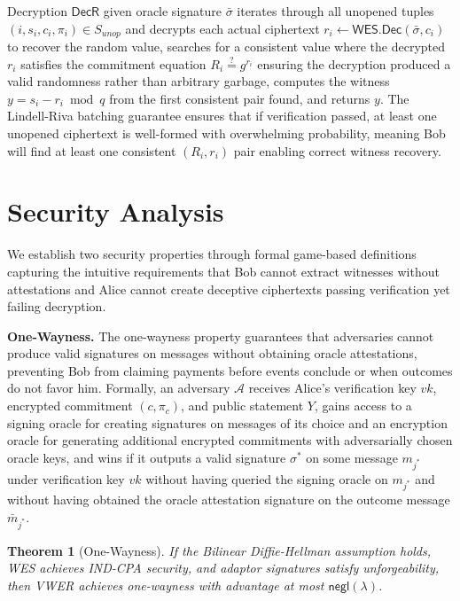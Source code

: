 \documentclass[11pt,a4paper]{article}
\newtheorem{theorem}{Theorem}[section]
\newcommand{\negl}{\textsf{negl}}
\begin{document}
{Decryption $\textsf{DecR}$ given oracle signature $\bar{\sigma}$ iterates through all unopened tuples $(i, s_i, c_i, \pi_i) \in S_{unop}$ and decrypts each actual ciphertext $r_i \leftarrow \textsf{WES.Dec}(\bar{\sigma}, c_i)$ to recover the random value, searches for a consistent value where the decrypted $r_i$ satisfies the commitment equation $R_i \stackrel{?}{=} g^{r_i}$ ensuring the decryption produced a valid randomness rather than arbitrary garbage, computes the witness $y = s_i - r_i \bmod q$ from the first consistent pair found, and returns $y$. The Lindell-Riva batching guarantee ensures that if verification passed, at least one unopened ciphertext is well-formed with overwhelming probability, meaning Bob will find at least one consistent $(R_i, r_i)$ pair enabling correct witness recovery.

\section{Security Analysis}

We establish two security properties through formal game-based definitions capturing the intuitive requirements that Bob cannot extract witnesses without attestations and Alice cannot create deceptive ciphertexts passing verification yet failing decryption.

\textbf{One-Wayness.} The one-wayness property guarantees that adversaries cannot produce valid signatures on messages without obtaining oracle attestations, preventing Bob from claiming payments before events conclude or when outcomes do not favor him. Formally, an adversary $\mathcal{A}$ receives Alice's verification key $vk$, encrypted commitment $(c, \pi_c)$, and public statement $Y$, gains access to a signing oracle for creating signatures on messages of its choice and an encryption oracle for generating additional encrypted commitments with adversarially chosen oracle keys, and wins if it outputs a valid signature $\sigma^*$ on some message $m_{j^*}$ under verification key $vk$ without having queried the signing oracle on $m_{j^*}$ and without having obtained the oracle attestation signature on the outcome message $\bar{m}_{j^*}$.

\begin{theorem}[One-Wayness]
If the Bilinear Diffie-Hellman assumption holds, WES achieves IND-CPA security, and adaptor signatures satisfy unforgeability, then VWER achieves one-wayness with advantage at most $\negl(\lambda)$.
\end{theorem}

}
\end{document}
